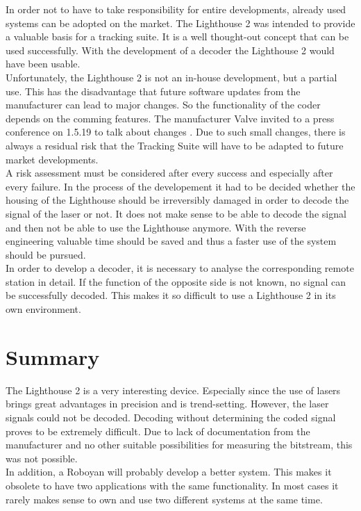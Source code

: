 \documentclass[a4paper,twoside, openright,12pt]{report}
\begin{document}
In order not to have to take responsibility for entire developments, already used systems can be adopted on the market. The Lighthouse 2 was intended to provide a valuable basis for a tracking suite. It is a well thought-out concept that can be used successfully. With the development of a decoder the Lighthouse 2 would have been usable. \\
Unfortunately, the Lighthouse 2 is not an in-house development, but a partial use. This has the disadvantage that future software updates from the manufacturer can lead to major changes. So the functionality of the coder depends on the comming features. The manufacturer Valve invited to a press conference on 1.5.19 to talk about changes \cite{.2019}. Due to such small changes, there is always a residual risk that the Tracking Suite will have to be adapted to future market developments. \\
A risk assessment must be considered after every success and especially after every failure. In the process of the developement it had to be decided whether the housing of the Lighthouse should be irreversibly damaged in order to decode the signal of the laser or not. It does not make sense to be able to decode the signal and then not be able to use the Lighthouse anymore. With the reverse engineering valuable time should be saved and thus a faster use of the system should be pursued. \\
In order to develop a decoder, it is necessary to analyse the corresponding remote station in detail. If the function of the opposite side is not known, no signal can be successfully decoded. This makes it so difficult to use a Lighthouse 2 in its own environment.


\chapter{Summary}
\label{Chapter_Summary}
The Lighthouse 2 is a very interesting device. Especially since the use of lasers brings great advantages in precision and is trend-setting. However, the laser signals could not be decoded. Decoding without determining the coded signal proves to be extremely difficult. Due to lack of documentation from the manufacturer and no other suitable possibilities for measuring the bitstream, this was not possible. \\
In addition, a Roboyan will probably develop a better system. This makes it obsolete to have two applications with the same functionality. In most cases it rarely makes sense to own and use two different systems at the same time. \\
\end{document}
